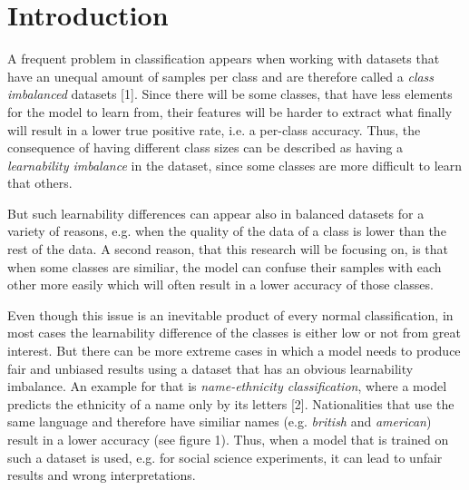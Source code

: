 \documentclass[journal]{IEEEtran}
\begin{document}
\begin{abstract}
\end{abstract}


\section{Introduction}
A frequent problem in classification appears when working with datasets that have an unequal amount of samples per class and are therefore called a \emph{class imbalanced} datasets [1]. %
Since there will be some classes, that have less elements for the model to learn from, their features will be harder to extract what finally will result in a lower true positive rate, i.e. a per-class accuracy.
Thus, the consequence of having different class sizes can be described as having a \emph{learnability imbalance} in the dataset, since some classes are more difficult to learn that others.

But such learnability differences can appear also in balanced datasets for a variety of reasons, e.g. when the quality of the data of a class is lower than the rest of the data. %
A second reason, that this research will be focusing on, is that when some classes are similiar,
the model can confuse their samples with each other more easily which will often result in a lower accuracy of those classes.

Even though this issue is an inevitable product of every normal classification, in most cases the learnability difference of the classes is either low or not from great interest.
But there can be more extreme cases in which a model needs to produce fair and unbiased results using a dataset that has an obvious learnability imbalance. 
An example for that is \emph{name-ethnicity classification}, where a model predicts the ethnicity of a name only by its letters [2]. 
Nationalities that use the same language and therefore have similiar names (e.g. \emph{british} and \emph{american}) result in a lower accuracy (see figure 1).
Thus, when a model that is trained on such a dataset is used, e.g. for social science experiments, it can lead to unfair results and wrong interpretations. 
\end{document}
